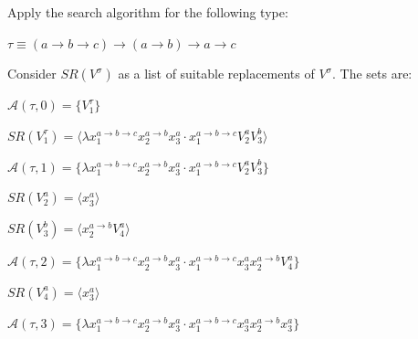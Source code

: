 \documentclass[a4paper,10pt]{article}
\begin{document}
\begin{exa}
  Apply the search algorithm for the following type:
     \begin{center}
           $\tau \equiv (a \to b \to c)\to (a \to b) \to a \to c$
     \end{center}
     Consider $SR(V^{\sigma})$ as a list of suitable replacements of $V^{\sigma}$.
     The sets are:
     \begin{center}
          $\mathcal{A}(\tau,0) = \{ V^{\tau}_1\}$
     \end{center}

     \begin{center}
          $SR(V^{\tau}_1) = \langle \lambda x^{a\to b \to c}_1 x^{a\to b}_2
          x^{a}_3 \cdot x^{a\to b \to c}_1 V^{a}_2 V^b_3 \rangle$
     \end{center}

     \begin{center}
          $\mathcal{A}(\tau,1) = \{ \lambda x^{a\to b \to c}_1 x^{a\to b}_2
          x^{a}_3 \cdot x^{a\to b \to c}_1 V^{a}_2 V^b_3\}$
     \end{center}

     \begin{center}
            $SR(V^{a}_2 ) = \langle x^{a}_3 \rangle$
     \end{center}
     

     \begin{center}
          $SR(V^b_3  ) = \langle x^{a\to b}_2 V^{a}_4\rangle$
     \end{center}

     \begin{center}
          $\mathcal{A}(\tau,2) = \{ \lambda x^{a\to b \to c}_1 x^{a\to b}_2
          x^{a}_3 \cdot x^{a\to b \to c}_1 x^{a}_3 x^{a\to b}_2 V^{a}_4\}$
     \end{center}

     \begin{center}
            $SR(V^{a}_4 ) = \langle x^{a}_3 \rangle$
     \end{center}

     \begin{center}
          $\mathcal{A}(\tau,3) = \{ \lambda x^{a\to b \to c}_1 x^{a\to b}_2
          x^{a}_3 \cdot x^{a\to b \to c}_1 x^{a}_3 x^{a\to b}_2 x^{a}_3\}$
     \end{center}
\end{exa}
\end{document}
